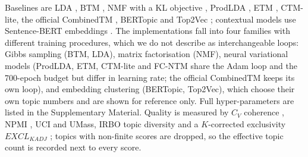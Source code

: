 \documentclass[11pt]{article}
\newcommand{\fcntm}{FC-NTM}
\begin{document}
Baselines are LDA \cite{blei2003lda}, BTM \cite{yan2013btm}, NMF with a KL objective
\cite{lee2001nmf}, ProdLDA \cite{srivastava2017avitm}, ETM \cite{dieng2020etm}, CTM-lite, the
official CombinedTM \cite{bianchi2021ctm}, BERTopic \cite{grootendorst2022bertopic} and Top2Vec
\cite{angelov2020top2vec}; contextual models use Sentence-BERT embeddings
\cite{reimers2019sbert}. The implementations fall into four families with different training
procedures, which we do not describe as interchangeable loops: Gibbs sampling (BTM, LDA), matrix
factorisation (NMF), neural variational models (ProdLDA, ETM, CTM-lite and \fcntm{} share the Adam
loop and the 700-epoch budget but differ in learning rate; the official CombinedTM keeps its own
loop), and embedding clustering (BERTopic, Top2Vec), which choose their own topic numbers and are
shown for reference only. Full hyper-parameters are listed in the Supplementary Material. Quality
is measured by $C_V$ coherence \cite{roder2015coherence}, NPMI \cite{bouma2009npmi,lau2014tea}, UCI
and UMass, IRBO topic diversity \cite{webber2010rbo} and a $K$-corrected exclusivity
$EXCL_{KADJ}$ \cite{bischof2012exclusivity}; topics with non-finite scores are dropped, so the
effective topic count is recorded next to every score.
\end{document}
